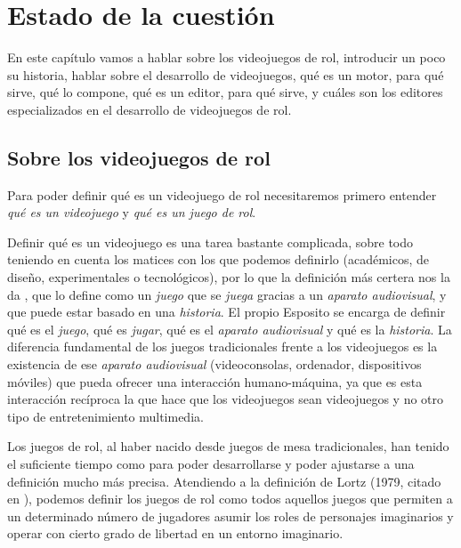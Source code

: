 \chapter{Estado de la cuestión}
\label{cap:estadoDeLaCuestion}

\begin{resumen}
En este capítulo vamos a hablar sobre los videojuegos de rol, introducir un poco su historia, hablar sobre el desarrollo de videojuegos, qué es un motor, para qué sirve, qué lo compone, qué es un editor, para qué sirve, y cuáles son los editores especializados en el desarrollo de videojuegos de rol.
\end{resumen}

\section{Sobre los videojuegos de rol}
Para poder definir qué es un videojuego de rol necesitaremos primero entender \textit{qué es un videojuego} y \textit{qué es un juego de rol}.

\medskip

Definir qué es un videojuego es una tarea bastante complicada, sobre todo teniendo en cuenta los matices con los que podemos definirlo (académicos, de diseño, experimentales o tecnológicos), por lo que la definición más certera nos la da \cite{EspositoVJ}, que lo define como \guillemotleft un \textit{juego} que se \textit{juega} gracias a un \textit{aparato audiovisual}, y que puede estar basado en una \textit{historia}\guillemotright. El propio Esposito se encarga de definir qué es el \textit{juego}, qué es \textit{jugar}, qué es el \textit{aparato audiovisual} y qué es la \textit{historia}. La diferencia fundamental de los juegos tradicionales frente a los videojuegos es la existencia de ese \textit{aparato audiovisual} (videoconsolas, ordenador, dispositivos móviles) que pueda ofrecer una interacción \guillemotleft humano-máquina\guillemotright, ya que es esta interacción recíproca la que hace que los videojuegos sean videojuegos y no otro tipo de entretenimiento multimedia.

\medskip

Los juegos de rol, al haber nacido desde juegos de mesa tradicionales, han tenido el suficiente tiempo como para poder desarrollarse y poder ajustarse a una definición mucho más precisa. Atendiendo a la definición de Lortz (1979, citado en \cite{FineRPG}), podemos definir los juegos de rol como \guillemotleft todos aquellos juegos que permiten a un determinado número de jugadores asumir los roles de personajes imaginarios y operar con cierto grado de libertad en un entorno imaginario\guillemotright.

